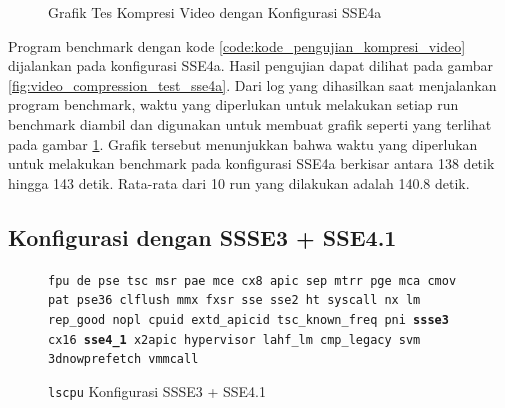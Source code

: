 \begin{figure}
    \centering
    \caption{Grafik Tes Kompresi Video dengan Konfigurasi SSE4a}
    \label{fig:video_compression_test_sse4a_graph}
\end{figure}

Program benchmark dengan kode \ref{code:kode_pengujian_kompresi_video} dijalankan pada konfigurasi SSE4a. Hasil pengujian dapat dilihat pada gambar \ref{fig:video_compression_test_sse4a}. Dari log yang dihasilkan saat menjalankan program benchmark, waktu yang diperlukan untuk melakukan setiap run benchmark diambil dan digunakan untuk membuat grafik seperti yang terlihat pada gambar \ref{fig:video_compression_test_sse4a_graph}. Grafik tersebut menunjukkan bahwa waktu yang diperlukan untuk melakukan benchmark pada konfigurasi SSE4a berkisar antara 138 detik hingga 143 detik. Rata-rata dari 10 run yang dilakukan adalah 140.8 detik.
\subsection{Konfigurasi dengan SSSE3 + SSE4.1}
\begin{figure}
    \texttt{fpu de pse tsc msr pae mce cx8 apic sep mtrr pge mca cmov pat pse36 clflush mmx fxsr sse sse2 ht syscall nx lm rep\_good nopl cpuid extd\_apicid tsc\_known\_freq pni \textbf{ssse3} cx16 \textbf{sse4\_1} x2apic hypervisor lahf\_lm cmp\_legacy svm 3dnowprefetch vmmcall}
    \caption{\texttt{lscpu} Konfigurasi SSSE3 + SSE4.1}
    \label{fig:lscpu_video_compression_test_ssse3,sse4.1}
\end{figure}

